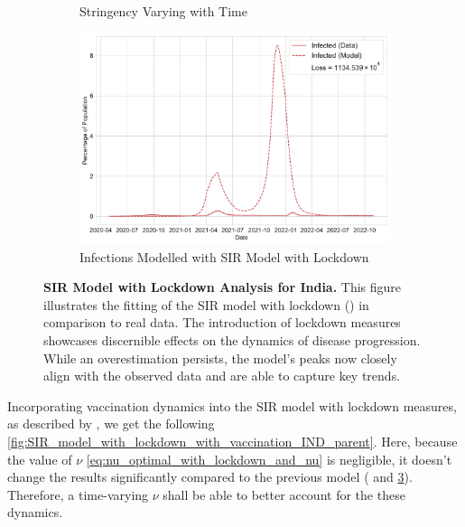 \documentclass[tikz,fleqn,12pt]{wlscirep}
\begin{document}
\begin{figure}[htbp!]
\begin{subfigure}[t]{\textwidth}
    \caption{Stringency Varying with Time}
    \label{fig:stringency_varying_with_time_IND}
  \end{subfigure}
  \begin{subfigure}[t]{\textwidth}
    \centering
    \includegraphics[scale=0.35]{images/SIR_model_with_lockdown_infections_IND.pdf}
    \caption{Infections Modelled with SIR Model with Lockdown}
    \label{fig:SIR_model_with_lockdown_infections_IND}
  \end{subfigure}
  \caption{\textbf{SIR Model with Lockdown Analysis for India.} This figure illustrates the fitting of the SIR model with lockdown () in comparison to real data. The introduction of lockdown measures showcases discernible effects on the dynamics of disease progression. While an overestimation persists, the model's peaks now closely align with the observed data and are able to capture key trends.}
  \label{fig:SIR_model_with_lockdown_IND_parent}
\end{figure}

Incorporating vaccination dynamics into the SIR model with lockdown measures, as described by , we get the following \cref{fig:SIR_model_with_lockdown_with_vaccination_IND_parent}. Here, because the value of $\nu$ \cref{eq:nu_optimal_with_lockdown_and_nu} is negligible, it doesn't change the results significantly compared to the previous model ( and \cref{fig:SIR_model_with_lockdown_IND_parent}). Therefore, a time-varying $\nu$ shall be able to better account for the these dynamics.
\end{document}
